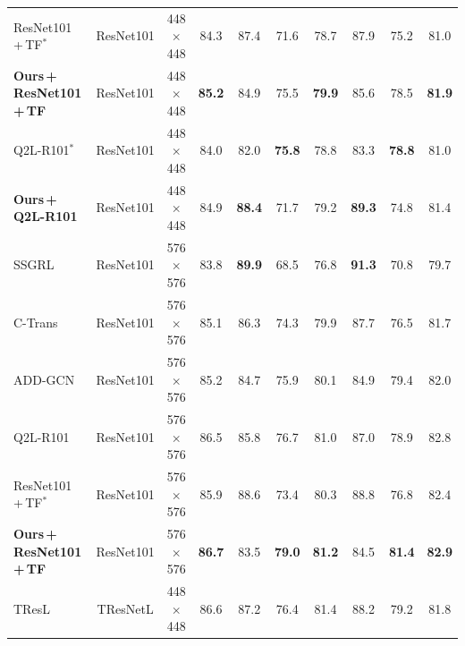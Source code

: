 \documentclass{article}
\begin{document}
\begin{table}[t]
{\begin{tabular}{lccccccccc}
        \midrule
        ResNet101\,+\,TF\textbf{$^*$}            & ResNet101      & 448$\times$448  & 84.3         & 87.4         & 71.6         & 78.7         & 87.9         & 75.2         & 81.0  \\
        \textbf{Ours\,+\,ResNet101\,+\,TF}       & ResNet101      & 448$\times$448  & \textbf{85.2}& 84.9         & 75.5         & \textbf{79.9}& 85.6         & 78.5         & \textbf{81.9}\\
        \midrule
        Q2L-R101\textbf{$^*$}                    & ResNet101      & 448$\times$448  & 84.0         & 82.0         & \textbf{75.8}& 78.8         & 83.3         & \textbf{78.8}& 81.0   \\
        \textbf{Ours\,+\,Q2L-R101}               & ResNet101      & 448$\times$448  & 84.9         & \textbf{88.4}& 71.7         & 79.2         & \textbf{89.3}& 74.8         & 81.4  \\
        \bottomrule
        \toprule
        SSGRL~\cite{chen2019learning}            & ResNet101      & 576$\times$576  & 83.8         & \textbf{89.9}& 68.5         & 76.8         & \textbf{91.3}& 70.8         & 79.7  \\
        C-Trans~\cite{lanchantin2021general} & ResNet101      & 576$\times$576  & 85.1         & 86.3         & 74.3         & 79.9         & 87.7         & 76.5         & 81.7  \\
        ADD-GCN~\cite{ye2020attention}           & ResNet101      & 576$\times$576  & 85.2         & 84.7         & 75.9         & 80.1         & 84.9         & 79.4         & 82.0  \\
        Q2L-R101~\cite{liu2021query2label}       & ResNet101      & 576$\times$576  & 86.5         & 85.8         & 76.7         & 81.0         & 87.0         & 78.9         & 82.8  \\
        \midrule
        ResNet101\,+\,TF\textbf{$^*$}            & ResNet101      & 576$\times$576  & 85.9         & 88.6         & 73.4         & 80.3         & 88.8         & 76.8         & 82.4  \\
        \textbf{Ours\,+\,ResNet101\,+\,TF}       & ResNet101      & 576$\times$576  & \textbf{86.7}& 83.5         & \textbf{79.0}& \textbf{81.2}& 84.5         & \textbf{81.4}& \textbf{82.9}\\
        \bottomrule
        \toprule
        TResL~\cite{ridnik2021asymmetric}        & TResNetL       & 448$\times$448  & 86.6         & 87.2         & 76.4         & 81.4         & 88.2         & 79.2         & 81.8  \\

\end{tabular}}
\end{table}
\end{document}
